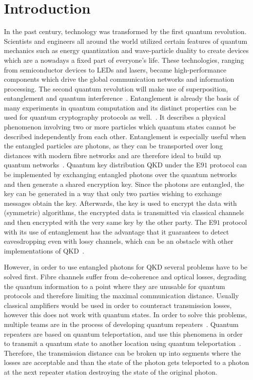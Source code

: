 \chapter{Introduction}

In the past century, technology was transformed by the first quantum revolution. Scientists and engineers all around the world utilized certain features of quantum mechanics such as energy quantization and wave-particle duality to create devices which are a nowadays a fixed part of everyone's life.
These technologies, ranging from semiconductor devices to LEDs and lasers, became high-performance components which drive the global communication networks and information processing.
The second quantum revolution will make use of superposition, entanglement and quantum interference~\cite{macfarlane_quantum_2003}.
Entanglement is already the basis of many experiments in quantum computation and its distinct properties can be used for quantum cryptography protocols as well.~\cite{zeilinger_light_2017}.
It describes a physical phenomenon involving two or more particles which quantum states cannot be described independently from each other.
Entanglement is especially useful when the entangled particles are photons, as they can be transported over long distances with modern fibre networks and are therefore ideal to build up quantum networks~\cite{gisin_quantum_2002}.
Quantum key distribution \acs{QKD}  under the E$91$ protocol can be implemented by exchanging entangled photons over the quantum networks and then generate a shared encryption key.
Since the photons are entangled, the key can be generated in a way that only two parties wishing to exchange messages obtain the key.
Afterwards, the key is used to encrypt the data with (symmetric) algorithms, the encrypted data is transmitted via classical channels and then encrypted with the very same key by the other party.
The E$91$ protocol with its use of entanglement has the advantage that it guarantees to detect eavesdropping even with lossy channels, which can be an obstacle with other implementations of \ac{QKD}~\cite{ekert_quantum_1991}.

However, in order to use entangled photons for \ac{QKD} several problems have to be solved first.
Fibre channels suffer from de-coherence and optical losses, degrading the quantum information to a point where they are unusable for quantum protocols and therefore limiting the maximal communication distance.
Usually classical amplifiers would be used in order to counteract transmission losses, however this does not work with quantum states.
In order to solve this problems, multiple teams are in the process of developing quantum repeaters~\cite{reindl_all-photonic_2018}\cite{duan_long-distance_2001}\cite{simon_quantum_2007}.
Quantum repeaters are based on quantum teleportation, and use this phenomena in order to transmit a quantum state to another location using quantum teleportation~\cite{bennett_teleporting_1993}.
Therefore, the transmission distance can be broken up into segments where the losses are acceptable and than the state of the photon gets teleported to a photon at the next repeater station destroying the state of the original photon.


